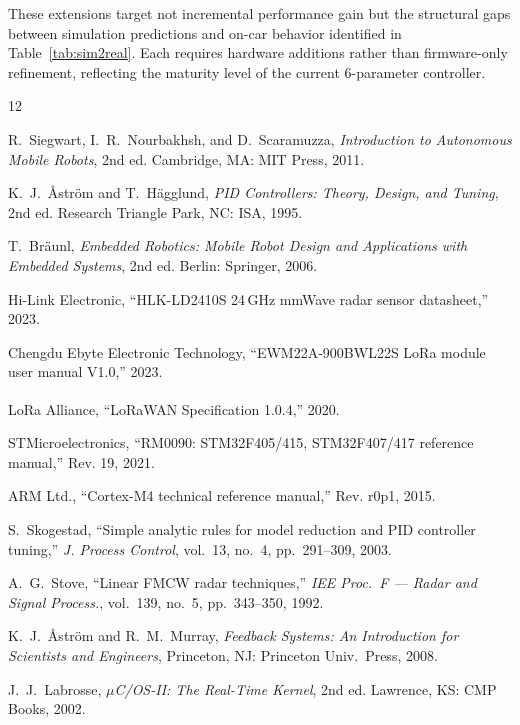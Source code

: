 \documentclass[letterpaper,journal]{IEEEtran}
\begin{document}
These extensions target not incremental performance gain but the structural gaps between simulation predictions and on-car behavior identified in Table~\ref{tab:sim2real}. Each requires hardware additions rather than firmware-only refinement, reflecting the maturity level of the current 6-parameter controller.

\begin{thebibliography}{12}

R.~Siegwart, I.~R.~Nourbakhsh, and D.~Scaramuzza, \textit{Introduction to Autonomous Mobile Robots}, 2nd ed. Cambridge, MA: MIT Press, 2011.

K.~J.~\AA str\"{o}m and T.~H\"{a}gglund, \textit{PID Controllers: Theory, Design, and Tuning}, 2nd ed. Research Triangle Park, NC: ISA, 1995.

T.~Br\"{a}unl, \textit{Embedded Robotics: Mobile Robot Design and Applications with Embedded Systems}, 2nd ed. Berlin: Springer, 2006.

Hi-Link Electronic, ``HLK-LD2410S 24\,GHz mmWave radar sensor datasheet,'' 2023.

Chengdu Ebyte Electronic Technology, ``EWM22A-900BWL22S LoRa module user manual V1.0,'' 2023.

LoRa Alliance, ``LoRaWAN\textsuperscript{\textregistered} Specification 1.0.4,'' 2020.

STMicroelectronics, ``RM0090: STM32F405/415, STM32F407/417 reference manual,'' Rev. 19, 2021.

ARM Ltd., ``Cortex-M4 technical reference manual,'' Rev. r0p1, 2015.

S.~Skogestad, ``Simple analytic rules for model reduction and PID controller tuning,'' \textit{J. Process Control}, vol.~13, no.~4, pp.~291--309, 2003.

A.~G.~Stove, ``Linear FMCW radar techniques,'' \textit{IEE Proc.\ F --- Radar and Signal Process.}, vol.~139, no.~5, pp.~343--350, 1992.

K.~J.~\AA str\"{o}m and R.~M.~Murray, \textit{Feedback Systems: An Introduction for Scientists and Engineers}, Princeton, NJ: Princeton Univ.\ Press, 2008.

J.~J.~Labrosse, \textit{$\mu$C/OS-II: The Real-Time Kernel}, 2nd ed. Lawrence, KS: CMP Books, 2002.

\end{thebibliography}
\end{document}
